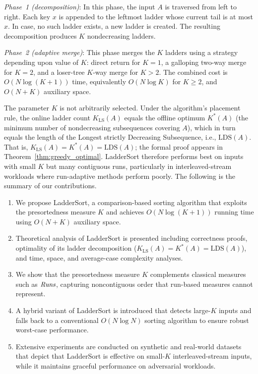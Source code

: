 \documentclass{ieeeaccess}
\theoremstyle{plain}
\theoremstyle{definition}
\begin{document}
\emph{Phase~1 (decomposition)}: In this phase, the input $A$ is traversed from left to right. Each key $x$ is appended to the leftmost ladder whose current tail is at most $x$. In case, no such ladder exists, a new ladder is created. The resulting decomposition produces $K$ nondecreasing ladders.

\emph{Phase~2 (adaptive merge)}: This phase merges the $K$ ladders using a strategy depending upon value of $K$: direct return for $K=1$, a galloping two-way merge for $K=2$, and a loser-tree $K$-way merge for $K > 2$.  The combined cost is $O(N\log(K+1))$ time, equivalently $O(N\log K)$ for $K \ge 2$, and $O(N+K)$ auxiliary space.

The parameter $K$ is not arbitrarily selected.  Under the algorithm's placement rule, the online ladder count $K_{\mathrm{LS}}(A)$ equals the offline optimum $K^*(A)$ (the minimum number of nondecreasing subsequences covering $A$), which in turn equals the length of the Longest strictly Decreasing Subsequence, i.e., $\mathrm{LDS}(A)$.  That is, $K_{\mathrm{LS}}(A) = K^*(A) = \mathrm{LDS}(A)$; the formal proof appears in Theorem~\ref{thm:greedy_optimal}.  LadderSort therefore performs best on inputs with small $K$ but many contiguous runs, particularly in interleaved-stream workloads where run-adaptive methods perform poorly.
The following is the summary of our contributions.

\begin{enumerate}

\item We propose LadderSort, a comparison-based sorting algorithm that exploits the presortedness measure $K$ and achieves
$O(N\log(K+1))$ running time using $O(N+K)$ auxiliary space.

\item Theoretical analysis of LadderSort is presented including correctness proofs, optimality of its ladder decomposition
($K_{\mathrm{LS}}(A)=K^*(A)=\mathrm{LDS}(A)$), and time, space, and average-case complexity analyses.

\item We show that the presortedness measure $K$ complements classical measures such as $\emph{Runs}$, capturing noncontiguous order that run-based measures cannot represent.

\item A hybrid variant of LadderSort is introduced that detects large-$K$ inputs and falls back to a conventional $O(N\log N)$ sorting algorithm to ensure robust worst-case performance.

\item Extensive experiments are conducted on synthetic and real-world datasets that depict that LadderSort is effective on small-$K$ interleaved-stream inputs, while it maintains graceful performance on adversarial workloads.

\end{enumerate}
\end{document}
